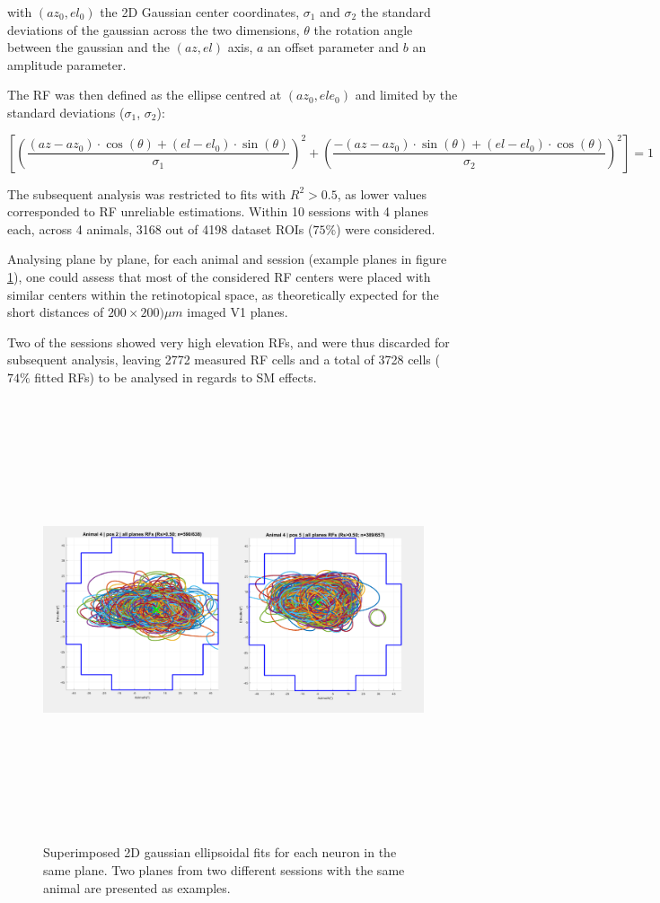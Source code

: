 with $(az_0, el_0)$ the 2D Gaussian center coordinates, $\sigma_1$ and $\sigma_2$ the standard deviations of the gaussian across the two dimensions, $\theta$ the rotation angle between the gaussian and the $(az,el)$ axis, $a$ an offset parameter and $b$ an amplitude parameter.

The RF was then defined as the ellipse centred at $(az_0, ele_0)$ and limited by the standard deviations  ($\sigma_1$, $\sigma_2$):

\begin{equation}
\left[ \left( \dfrac{(az-az_0)\cdot \cos(\theta) + (el-el_0)\cdot \sin(\theta)}{\sigma_1}\right)^2 + \left(\dfrac{-(az-az_0)\cdot \sin(\theta) + (el-el_0)\cdot \cos(\theta)}{\sigma_2}\right)^2\right]=1
\end{equation}

The subsequent analysis was restricted to fits with $R^2>0.5$, as lower values corresponded to RF unreliable estimations. Within 10 sessions with 4 planes each, across 4 animals, 3168 out of 4198 dataset ROIs ($75\%$) were considered.

Analysing plane by plane, for each animal and session (example planes in figure \ref{ellipses}), one could assess that most of the considered RF centers were placed with similar centers within the retinotopical space, as theoretically expected for the short distances of $200 \times 200) \mu m$ imaged V1 planes. 

Two of the sessions showed very high elevation RFs, and were thus discarded for subsequent analysis, leaving 2772 measured RF cells and a total of 3728 cells ($74\%$ fitted RFs) to be analysed in regards to SM effects.

\begin{figure}[H] \centering \includegraphics[width=13cm,height=13cm,keepaspectratio]{Figures/7.Results/rf/ellipsesAnimal4pos2andpos5.png} 
\caption{Superimposed 2D gaussian ellipsoidal fits for each neuron in the same plane. Two planes from two different sessions with the same animal are presented as examples.}
\label{ellipses}
\end{figure}

